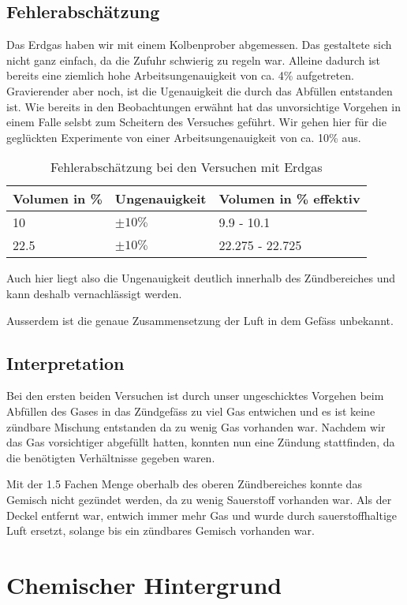 \documentclass[11pt,paper=a4,final]{scrartcl}
\begin{document}
\subsection{Fehlerabsch\"atzung}
Das Erdgas haben wir mit einem Kolbenprober abgemessen. Das gestaltete sich
nicht ganz einfach, da die Zufuhr schwierig zu regeln war. Alleine dadurch ist
bereits eine ziemlich hohe Arbeitsungenauigkeit von ca. 4\% aufgetreten.
Gravierender aber noch, ist die Ugenauigkeit die durch das Abf\"ullen entstanden
ist. Wie bereits in den Beobachtungen erw\"ahnt hat das unvorsichtige Vorgehen
in einem Falle selsbt zum Scheitern des Versuches gef\"uhrt. Wir gehen hier
f\"ur die gegl\"uckten Experimente von einer Arbeitsungenauigkeit von ca. 10\%
aus.
\begin{table}[h!]
  \centering
  \begin{tabular}{|l|l|l|}\hline
    \bf Volumen in \%	& \bf Ungenauigkeit	& \bf Volumen in \% effektiv \\
    \hline
    10			& \(\pm 10\%\)		& 9.9 - 10.1 \\
    \hline
    22.5		& \(\pm 10\%\)		& 22.275 - 22.725 \\
    \hline
  \end{tabular}
  \caption{Fehlerabsch\"atzung bei den Versuchen mit Erdgas}
  \label{tab:}
\end{table}
Auch hier liegt also die Ungenauigkeit deutlich innerhalb des Z\"undbereiches
und kann deshalb vernachl\"assigt werden.

Ausserdem ist die genaue Zusammensetzung der Luft in dem Gef\"ass unbekannt.
\subsection{Interpretation}
Bei den ersten beiden Versuchen ist durch unser ungeschicktes Vorgehen beim
Abf\"ullen des Gases in das Z\"undgef\"ass zu viel Gas entwichen und es ist
keine z\"undbare Mischung entstanden da zu wenig Gas vorhanden war. Nachdem wir
das Gas vorsichtiger abgef\"ullt hatten, konnten nun eine Z\"undung stattfinden,
da die ben\"otigten Verh\"altnisse gegeben waren.

Mit der 1.5 Fachen Menge oberhalb des oberen Z\"undbereiches konnte das Gemisch
nicht gez\"undet werden, da zu wenig Sauerstoff vorhanden war. Als der Deckel
entfernt war, entwich immer mehr Gas und wurde durch sauerstoffhaltige Luft
ersetzt, solange bis ein z\"undbares Gemisch vorhanden war.

\section{Chemischer Hintergrund}
\end{document}

